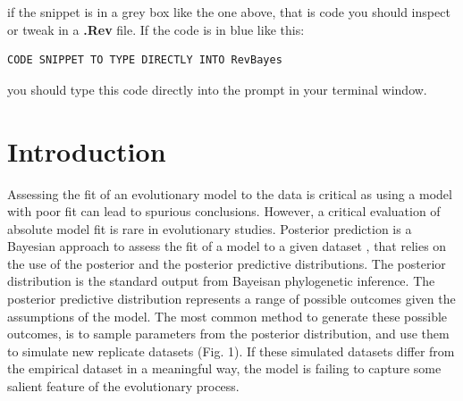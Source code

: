 if the snippet is in a grey box like the one above, that is code you should inspect or tweak in a \textbf{.Rev} file.
If the code is in blue like this: 
{\tt \begin{Snugshade}[184,207,236]
\begin{lstlisting}
CODE SNIPPET TO TYPE DIRECTLY INTO RevBayes
\end{lstlisting}
\end{Snugshade}}
you should type this code directly into the \RevBayes prompt in your terminal window.

\section{Introduction}
Assessing the fit of an evolutionary model to the data is critical as using a model with poor fit can lead to 
spurious conclusions. However, a critical evaluation of absolute model fit is rare in evolutionary studies.
Posterior prediction is a Bayesian approach to assess the fit of a model to a given dataset \citep{Bollback2002-ki,Brown2014-jl,Gelman2014-ay},
that relies on the use of the posterior and the posterior predictive distributions. 
The posterior distribution is the standard output from Bayeisan phylogenetic inference. The posterior predictive 
distribution represents a range of possible outcomes given the assumptions of the model. The most common method to 
generate these possible outcomes, is to sample parameters from the posterior distribution, and use them 
to simulate new replicate datasets (Fig. 1). If these simulated datasets differ from the empirical dataset in a
meaningful way, the model is failing to capture some salient feature of the evolutionary process. 


